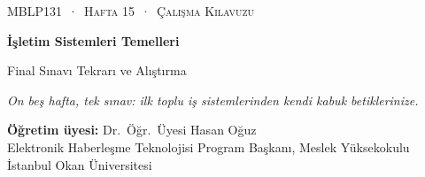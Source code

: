 \setlength{\emergencystretch}{3em}
\newcommand{\gantt}[2]{%
\begin{tikzpicture}[x=#1cm,y=1cm]
\foreach \p/\a/\b in {#2} {
  \fill[col\p] (\a,0) rectangle (\b,0.62);
  \draw[white,line width=1.2pt] (\a,0) -- (\a,0.62);
  \node[font=\small\bfseries,text=txt\p] at ({(\a+\b)/2},0.31) {\p};
  \draw[muted] (\a,0) -- (\a,-0.1) node[below,font=\scriptsize,text=muted,inner sep=1.5pt] {\a};
  \draw[muted] (\b,0) -- (\b,-0.1) node[below,font=\scriptsize,text=muted,inner sep=1.5pt] {\b};
}
\end{tikzpicture}}
\newcommand{\nw}[1]{\textbf{\color{mintdeep}#1}}
\newcommand{\F}{\textcolor{red!70!black}{\textbf{F}}}
\newcommand{\pts}[1]{\hfill\textcolor{mintdeep}{\textbf{[#1~puan]}}}

\thispagestyle{empty}
\begin{tcolorbox}[enhanced,colback=dark,colframe=dark,arc=0pt,boxrule=0pt,
  left=18pt,right=18pt,top=20pt,bottom=20pt,coltext=white]
{\small\color{mint}\textsc{MBLP131 \,·\, Hafta 15 \,·\, Çalışma Kılavuzu}}\par\medskip
{\headfont\fontsize{26}{30}\selectfont\bfseries İşletim Sistemleri Temelleri}\par\medskip
{\large Final Sınavı Tekrarı ve Alıştırma}\par\smallskip
{\small\itshape\color{white!70} On beş hafta, tek sınav: ilk toplu iş sistemlerinden kendi kabuk betiklerinize.}
\end{tcolorbox}

\vspace{0.4em}
\begin{minipage}[t]{0.70\linewidth}
\small
\textbf{Öğretim üyesi:} Dr.\ Öğr.\ Üyesi Hasan Oğuz\\
Elektronik Haberleşme Teknolojisi Program Başkanı, Meslek Yüksekokulu\\
İstanbul Okan Üniversitesi
\end{minipage}

